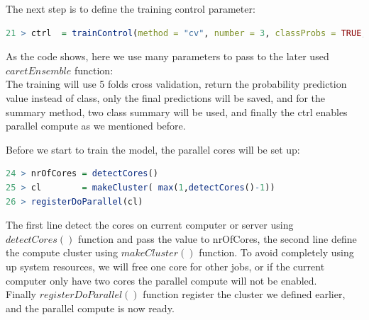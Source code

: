 \documentclass[12pt, a4paper, bibliography=totoc, english]{scrartcl}
\begin{document}
The next step is to define the training control parameter:
\begin{lstlisting}[language = R]
21 > ctrl  = trainControl(method = "cv", number = 3, classProbs = TRUE,  savePredictions = "final", summaryFunction = twoClassSummary, allowParallel = TRUE)
\end{lstlisting}

As the code shows, here we use many parameters to pass to the later used $caretEnsemble$ function:\\
The training will use 5 folds cross validation, return the probability prediction value instead of class, only the final predictions will be saved, and for the summary method, two class summary will be used, and finally the ctrl enables parallel compute as we mentioned before.\indent

Before we start to train the model, the parallel cores will be set up:\\
\begin{lstlisting}[language = R]
24 > nrOfCores = detectCores()
25 > cl        = makeCluster( max(1,detectCores()-1))
26 > registerDoParallel(cl)

\end{lstlisting}
The first line detect the cores on current computer or server using $detectCores()$ function and pass the value to nrOfCores, the second line define the compute cluster using $makeCluster()$ function. To avoid completely using up system resources, we will free one core for other jobs, or if the current computer only have two cores the parallel compute will not be enabled.\\
Finally $registerDoParallel()$ function register the cluster we defined earlier, and the parallel compute is now ready.\indent
\end{document}
